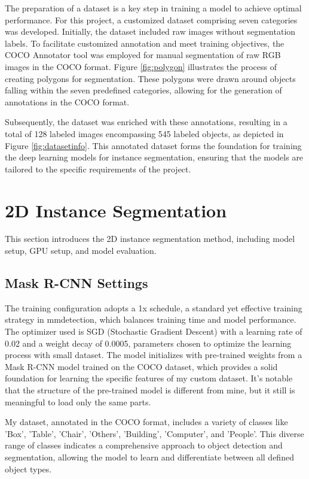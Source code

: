 The preparation of a dataset is a key step in training a model to achieve optimal performance. For this project, a customized dataset comprising seven categories was developed. Initially, the dataset included raw images without segmentation labels. To facilitate customized annotation and meet training objectives, the COCO Annotator tool was employed for manual segmentation of raw RGB images in the COCO format. Figure \ref{fig:polygon} illustrates the process of creating polygons for segmentation. These polygons were drawn around objects falling within the seven predefined categories, allowing for the generation of annotations in the COCO format.

Subsequently, the dataset was enriched with these annotations, resulting in a total of 128 labeled images encompassing 545 labeled objects, as depicted in Figure \ref{fig:datasetinfo}. This annotated dataset forms the foundation for training the deep learning models for instance segmentation, ensuring that the models are tailored to the specific requirements of the project.

\section{2D Instance Segmentation}
This section introduces the 2D instance segmentation method, including model setup, GPU setup, and model evaluation.

\subsection{Mask R-CNN Settings}
The training configuration adopts a 1x schedule, a standard yet effective training strategy in mmdetection, which balances training time and model performance. The optimizer used is SGD (Stochastic Gradient Descent) with a learning rate of 0.02 and a weight decay of 0.0005, parameters chosen to optimize the learning process with small dataset. The model initializes with pre-trained weights from a Mask R-CNN model trained on the COCO dataset, which provides a solid foundation for learning the specific features of my custom dataset. It's notable that the structure of the pre-trained model is different from mine, but it still is meaningful to load only the same parts.

My dataset, annotated in the COCO format, includes a variety of classes like 'Box', 'Table', 'Chair', 'Others', 'Building', 'Computer', and 'People'. This diverse range of classes indicates a comprehensive approach to object detection and segmentation, allowing the model to learn and differentiate between all defined object types.

